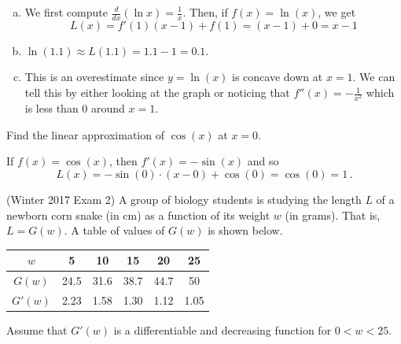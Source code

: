 \documentclass[11pt]{exam}
\begin{document}
\begin{questions}
    \begin{solution}
      \begin{enumerate}[(a)]
      \item We first compute \(\frac{d}{dx}(\ln x) =
        \frac{1}{x}\). Then, if \(f(x) = \ln(x)\), we get \[
          L(x) = f'(1)(x-1)+f(1) = (x-1)+0 = x-1
        \]
      \item \(\ln(1.1) \approx L(1.1) = 1.1-1 = 0.1\).
      \item This is an
        overestimate since \(y=\ln(x)\) is concave down at \(x=1\). We can tell
        this by either looking at the graph or noticing that \(f''(x)
        = -\frac{1}{x^2}\) which is less than \(0\) around \(x=1\).
      \end{enumerate}
    \end{solution}
\vspace{0.1in}
  \question Find the linear approximation of \(\cos(x)\) at \(x=0\).
    \begin{solution}
      If \(f(x) = \cos(x)\), then \(f'(x) = -\sin(x)\) and so \[
        L(x) = -\sin(0) \cdot (x-0)+\cos(0) = \cos(0) = 1\,.
      \]
    \end{solution}
\vspace{0.1in}
  \question (Winter 2017 Exam 2) %
A group of biology students is studying the length \(L\) of a newborn corn snake (in
cm) as a function of its weight \(w\) (in grams). That is, \(L = G(w)\). A table of values of \(G(w)\) is
shown below.
\begin{center}
  \begin{tabular}{c|c|c|c|c|c}
    \(w\)&5&10&15&20&25\\
    \hline
    \(G(w)\)&24.5&31.6&38.7&44.7&50\\
    \hline
    \(G'(w)\)&2.23&1.58&1.30&1.12&1.05\\
  \end{tabular}
\end{center}
Assume that \(G'(w)\) is a differentiable and decreasing function for \(0 < w < 25\).
\end{questions}
\end{document}
